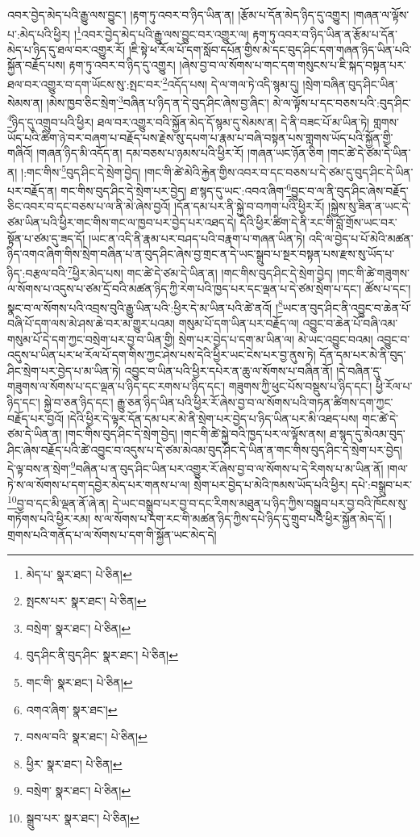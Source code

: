 འབར་བྱེད་མེད་པའི་རྒྱུ་ལས་བྱུང་། །རྟག་ཏུ་འབར་བ་ཉིད་ཡིན་ན། །རྩོམ་པ་དོན་མེད་ཉིད་དུ་འགྱུར། །གཞན་ལ་ལྟོས་པ་:མེད་པའི་ཕྱིར། །\footnote{མེད་པ་  སྣར་ཐང་།  པེ་ཅིན། }འབར་བྱེད་མེད་པའི་རྒྱུ་ལས་བྱུང་བར་འགྱུར་ལ། རྟག་ཏུ་འབར་བ་ཉིད་ཡིན་ན་རྩོམ་པ་དོན་མེད་པ་ཉིད་དུ་ཐལ་བར་འགྱུར་རོ། །ཇི་སྟེ་ཕ་རོལ་པོ་དག་སློབ་དཔོན་གྱིས་མེ་དང་བུད་ཤིང་དག་གཞན་ཉིད་ཡིན་པའི་སྐྱོན་བརྗོད་པས། རྟག་ཏུ་འབར་བ་ཉིད་དུ་འགྱུར། །ཞེས་བྱ་བ་ལ་སོགས་པ་གང་དག་གསུངས་པ་ཇི་སྐད་བསྟན་པར་ཐལ་བར་འགྱུར་བ་དག་ཡོངས་སུ་:སྤང་བར་\footnote{སྤངས་པར་  སྣར་ཐང་།  པེ་ཅིན། }འདོད་པས། དེ་ལ་གལ་ཏེ་འདི་སྙམ་དུ། །སྲེག་བཞིན་བུད་ཤིང་ཡིན་སེམས་ན། །མེས་ཁྱབ་ཅིང་སྲེག་\footnote{བསྲེག་  སྣར་ཐང་།  པེ་ཅིན། }བཞིན་པ་ཉིད་ན་དེ་བུད་ཤིང་ཞེས་བྱ་ཞིང་། མེ་ལ་ལྟོས་པ་དང་བཅས་པའི་:བུད་ཤིང་\footnote{བུད་ཤིང་ནི་བུད་ཤིང་  སྣར་ཐང་།  པེ་ཅིན། }ཉིད་དུ་འགྲུབ་པའི་ཕྱིར། ཐལ་བར་འགྱུར་བའི་སྐྱོན་མེད་དོ་སྙམ་དུ་སེམས་ན། དེ་ནི་བཟང་པོ་མ་ཡིན་ཏེ། གླགས་ཡོད་པའི་ཚིག་ཉེ་བར་བཞག་པ་བརྗོད་པས་རྗེས་སུ་དཔག་པ་རྣམ་པ་བཞི་བསྟན་པས་གླགས་ཡོད་པའི་སྐྱོན་གྱི་གཞིའོ། །གཞན་ཉིད་མི་འདོད་ན། དམ་བཅས་པ་ཉམས་པའི་ཕྱིར་རོ། །གཞན་ཡང་ཉོན་ཅིག །གང་ཚེ་དེ་ཙམ་དེ་ཡིན་ན། །:གང་གིས་\footnote{གང་གི་  སྣར་ཐང་།  པེ་ཅིན། }བུད་ཤིང་དེ་སྲེག་བྱེད། །གང་གི་ཚེ་མེའི་རྐྱེན་གྱིས་འབར་བ་དང་བཅས་པ་དེ་ཙམ་དུ་བུད་ཤིང་དེ་ཡིན་པར་བརྗོད་ན། གང་གིས་བུད་ཤིང་དེ་སྲེག་པར་བྱེད། ཐ་སྙད་དུ་ཡང་:འབའ་ཞིག་\footnote{འགའ་ཞིག་  སྣར་ཐང་། }བྱུང་བ་ལ་ནི་བུད་ཤིང་ཞེས་བརྗོད་ཅིང་འབར་བ་དང་བཅས་པ་ལ་ནི་མེ་ཞེས་བྱའོ། །དོན་དམ་པར་ནི་སྐྱེ་བ་བཀག་པའི་ཕྱིར་རོ། །སྐྱེས་སུ་ཟིན་ན་ཡང་དེ་ཙམ་ཡིན་པའི་ཕྱིར་གང་གིས་གང་ལ་ཁྱབ་པར་བྱེད་པར་འཐད་དེ། དེའི་ཕྱིར་ཚིག་དེ་ནི་རང་གི་བློ་གྲོས་ཡང་བར་སྟོན་པ་ཙམ་དུ་ཟད་དོ། །ཡང་ན་འདི་ནི་རྣམ་པར་བཤད་པའི་བརྣག་པ་གཞན་ཡིན་ཏེ། འདི་ལ་བྱེད་པ་པོ་མེའི་མཚན་ཉིད་འགའ་ཞིག་གིས་སྲེག་བཞིན་པ་ན་བུད་ཤིང་ཞེས་བྱ་གྲང་ན་དེ་ཡང་སྒྲུབ་པ་སྔར་བསྟན་པས་རྫས་སུ་ཡོད་པ་ཉིད་:བརྩལ་བའི་\footnote{བསལ་བའི་  སྣར་ཐང་།  པེ་ཅིན། }ཕྱིར་མེད་པས། གང་ཚེ་དེ་ཙམ་དེ་ཡིན་ན། །གང་གིས་བུད་ཤིང་དེ་སྲེག་བྱེད། །གང་གི་ཚེ་གཟུགས་ལ་སོགས་པ་འདུས་པ་ཙམ་དྲོ་བའི་མཚན་ཉིད་ཀྱི་རེག་པའི་ཁྱད་པར་དང་ལྡན་པ་དེ་ཙམ་སྲེག་པ་དང་། ཚོས་པ་དང་། སྣང་བ་ལ་སོགས་པའི་འབྲས་བུའི་རྒྱུ་ཡིན་པའི་:ཕྱིར་དེ་མ་ཡིན་པའི་ཚེ་ནའོ། །\footnote{ཕྱིར་  སྣར་ཐང་།  པེ་ཅིན། }ཡང་ན་བུད་ཤིང་ནི་འབྱུང་བ་ཆེན་པོ་བཞི་པོ་དག་ལས་མེ་ཤས་ཆེ་བར་མ་གྱུར་པའམ། གསུམ་པོ་དག་ཡིན་པར་བརྗོད་ལ། འབྱུང་བ་ཆེན་པོ་བཞི་འམ་གསུམ་པོ་དེ་དག་ཀྱང་བསྲེག་པར་བྱ་བ་ཡིན་གྱི། སྲེག་པར་བྱེད་པ་དག་མ་ཡིན་ལ། མེ་ཡང་འབྱུང་བའམ། འབྱུང་བ་འདུས་པ་ཡིན་པར་ཕ་རོལ་པོ་དག་གིས་ཀྱང་ཤེས་པས་དེའི་ཕྱིར་ཡང་ངེས་པར་བྱ་ནུས་ཏེ། དོན་དམ་པར་མེ་ནི་བུད་ཤིང་སྲེག་པར་བྱེད་པ་མ་ཡིན་ཏེ། འབྱུང་བ་ཡིན་པའི་ཕྱིར་དཔེར་ན་ཆུ་ལ་སོགས་པ་བཞིན་ནོ། །དེ་བཞིན་དུ་གཟུགས་ལ་སོགས་པ་དང་ལྡན་པ་ཉིད་དང་རགས་པ་ཉིད་དང་། གཟུགས་ཀྱི་ཕུང་པོས་བསྡུས་པ་ཉིད་དང་། ཕྱི་རོལ་པ་ཉིད་དང་། སྐྱེ་བ་ཅན་ཉིད་དང་། རྒྱུ་ཅན་ཉིད་ཡིན་པའི་ཕྱིར་རོ་ཞེས་བྱ་བ་ལ་སོགས་པའི་གཏན་ཚིགས་དག་ཀྱང་བརྗོད་པར་བྱའོ། །དེའི་ཕྱིར་དེ་ལྟར་དོན་དམ་པར་མེ་ནི་སྲེག་པར་བྱེད་པ་ཉིད་ཡིན་པར་མི་འཐད་པས། གང་ཚེ་དེ་ཙམ་དེ་ཡིན་ན། །གང་གིས་བུད་ཤིང་དེ་སྲེག་བྱེད། །གང་གི་ཚེ་སྐྱེ་བའི་ཁྱད་པར་ལ་ལྟོས་ནས། ཐ་སྙད་དུ་མེའམ་བུད་ཤིང་ཞེས་བརྗོད་པའི་ཚེ་འབྱུང་བ་འདུས་པ་དེ་ཙམ་མེའམ་བུད་ཤིང་དེ་ཡིན་ན་གང་གིས་བུད་ཤིང་དེ་སྲེག་པར་བྱེད། དེ་ལྟ་བས་ན་སྲེག་\footnote{བསྲེག་  སྣར་ཐང་།  པེ་ཅིན། }བཞིན་པ་ན་བུད་ཤིང་ཡིན་པར་འགྱུར་རོ་ཞེས་བྱ་བ་ལ་སོགས་པ་དེ་རིགས་པ་མ་ཡིན་ནོ། །གལ་ཏེ་ས་ལ་སོགས་པ་དག་དབྱེར་མེད་པར་གནས་པ་ལ། སྲེག་པར་བྱེད་པ་མེའི་ཁམས་ཡོད་པའི་ཕྱིར། དཔེ་:བསྒྲུབ་པར་\footnote{སྒྲུབ་པར་  སྣར་ཐང་།  པེ་ཅིན། }བྱ་བ་དང་མི་ལྡན་ནོ་ཞེ་ན། དེ་ཡང་བསྒྲུབ་པར་བྱ་བ་དང་རིགས་མཐུན་པ་ཉིད་ཀྱིས་བསྒྲུབ་པར་བྱ་བའི་ཁོངས་སུ་གཏོགས་པའི་ཕྱིར་རམ། ས་ལ་སོགས་པ་དག་རང་གི་མཚན་ཉིད་ཀྱིས་དཔེ་ཉིད་དུ་གྲུབ་པའི་ཕྱིར་སྐྱོན་མེད་དོ། །གྲགས་པའི་གནོད་པ་ལ་སོགས་པ་དག་གི་སྐྱོན་ཡང་མེད་དེ། 